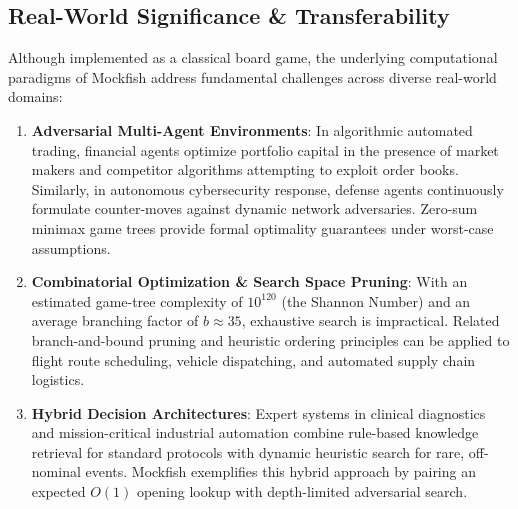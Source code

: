 \documentclass[11pt,a4paper]{article}
\begin{document}
\subsection{Real-World Significance \& Transferability}
Although implemented as a classical board game, the underlying computational paradigms of Mockfish address fundamental challenges across diverse real-world domains:
\begin{enumerate}[leftmargin=*]
    \item \textbf{Adversarial Multi-Agent Environments}: In algorithmic automated trading, financial agents optimize portfolio capital in the presence of market makers and competitor algorithms attempting to exploit order books. Similarly, in autonomous cybersecurity response, defense agents continuously formulate counter-moves against dynamic network adversaries. Zero-sum minimax game trees provide formal optimality guarantees under worst-case assumptions.
    \item \textbf{Combinatorial Optimization \& Search Space Pruning}: With an estimated game-tree complexity of $10^{120}$ (the Shannon Number) and an average branching factor of $b \approx 35$, exhaustive search is impractical. Related branch-and-bound pruning and heuristic ordering principles can be applied to flight route scheduling, vehicle dispatching, and automated supply chain logistics.
    \item \textbf{Hybrid Decision Architectures}: Expert systems in clinical diagnostics and mission-critical industrial automation combine rule-based knowledge retrieval for standard protocols with dynamic heuristic search for rare, off-nominal events. Mockfish exemplifies this hybrid approach by pairing an expected $O(1)$ opening lookup with depth-limited adversarial search.
\end{enumerate}
\end{document}
